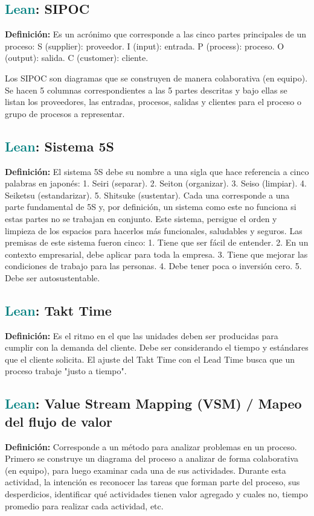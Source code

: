 \documentclass[12pt]{article}
\begin{document}
\subsection{\textcolor{teal}{Lean}: SIPOC}
\textbf{Definición:} Es un acrónimo que corresponde a las cinco partes principales de un proceso:
S (supplier): proveedor.
I (input): entrada.
P (process): proceso.
O (output): salida.
C (customer): cliente.

Los SIPOC son diagramas que se construyen de manera colaborativa (en equipo). Se hacen 5 columnas correspondientes a las 5 partes descritas y bajo ellas se listan los proveedores, las entradas, procesos, salidas y clientes para el proceso o grupo de procesos a representar.
\subsection{\textcolor{teal}{Lean}: Sistema 5S}
\textbf{Definición:} El sistema 5S debe su nombre a una sigla que hace referencia a cinco palabras en japonés:
1.	Seiri (separar).
2.	Seiton (organizar).
3.	Seiso (limpiar).
4.	Seiketsu (estandarizar).
5.	Shitsuke (sustentar).
Cada una corresponde a una parte fundamental de 5S y, por definición, un sistema como este no funciona si estas partes no se trabajan en conjunto. Este sistema, persigue el orden y limpieza de los espacios para hacerlos más funcionales, saludables y seguros. Las premisas de este sistema fueron cinco:
1.	Tiene que ser fácil de entender.
2.	En un contexto empresarial, debe aplicar para toda la empresa.
3.	Tiene que mejorar las condiciones de trabajo para las personas.
4.	Debe tener poca o inversión cero.
5.	Debe ser autosustentable.
\subsection{\textcolor{teal}{Lean}: Takt Time}
\textbf{Definición:} Es el ritmo en el que las unidades deben ser producidas para cumplir con la demanda del cliente. Debe ser considerando el tiempo y estándares que el cliente solicita.
El ajuste del Takt Time con el Lead Time busca que un proceso trabaje "justo a tiempo".
\subsection{\textcolor{teal}{Lean}: Value Stream Mapping (VSM) / Mapeo del flujo de valor}
\textbf{Definición:} Corresponde a un método para analizar problemas en un proceso. Primero se construye un diagrama del proceso a analizar de forma colaborativa (en equipo), para luego examinar cada una de sus actividades. Durante esta actividad, la intención es reconocer las tareas que forman parte del proceso, sus desperdicios, identificar qué actividades tienen valor agregado y cuales no, tiempo promedio para realizar cada actividad, etc.
\end{document}
